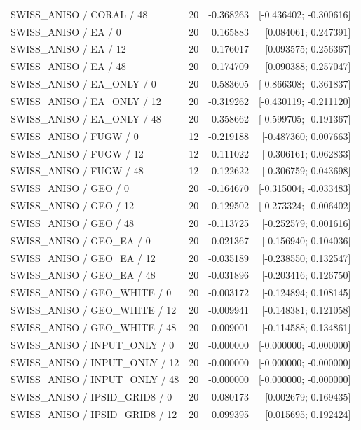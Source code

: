 \begin{longtable}{p{.56\linewidth}rrr}
SWISS\_ANISO / CORAL / 48 & 20 & -0.368263 & [-0.436402; -0.300616] \\
SWISS\_ANISO / EA / 0 & 20 & 0.165883 & [0.084061; 0.247391] \\
SWISS\_ANISO / EA / 12 & 20 & 0.176017 & [0.093575; 0.256367] \\
SWISS\_ANISO / EA / 48 & 20 & 0.174709 & [0.090388; 0.257047] \\
SWISS\_ANISO / EA\_ONLY / 0 & 20 & -0.583605 & [-0.866308; -0.361837] \\
SWISS\_ANISO / EA\_ONLY / 12 & 20 & -0.319262 & [-0.430119; -0.211120] \\
SWISS\_ANISO / EA\_ONLY / 48 & 20 & -0.358662 & [-0.599705; -0.191367] \\
SWISS\_ANISO / FUGW / 0 & 12 & -0.219188 & [-0.487360; 0.007663] \\
SWISS\_ANISO / FUGW / 12 & 12 & -0.111022 & [-0.306161; 0.062833] \\
SWISS\_ANISO / FUGW / 48 & 12 & -0.122622 & [-0.306759; 0.043698] \\
SWISS\_ANISO / GEO / 0 & 20 & -0.164670 & [-0.315004; -0.033483] \\
SWISS\_ANISO / GEO / 12 & 20 & -0.129502 & [-0.273324; -0.006402] \\
SWISS\_ANISO / GEO / 48 & 20 & -0.113725 & [-0.252579; 0.001616] \\
SWISS\_ANISO / GEO\_EA / 0 & 20 & -0.021367 & [-0.156940; 0.104036] \\
SWISS\_ANISO / GEO\_EA / 12 & 20 & -0.035189 & [-0.238550; 0.132547] \\
SWISS\_ANISO / GEO\_EA / 48 & 20 & -0.031896 & [-0.203416; 0.126750] \\
SWISS\_ANISO / GEO\_WHITE / 0 & 20 & -0.003172 & [-0.124894; 0.108145] \\
SWISS\_ANISO / GEO\_WHITE / 12 & 20 & -0.009941 & [-0.148381; 0.121058] \\
SWISS\_ANISO / GEO\_WHITE / 48 & 20 & 0.009001 & [-0.114588; 0.134861] \\
SWISS\_ANISO / INPUT\_ONLY / 0 & 20 & -0.000000 & [-0.000000; -0.000000] \\
SWISS\_ANISO / INPUT\_ONLY / 12 & 20 & -0.000000 & [-0.000000; -0.000000] \\
SWISS\_ANISO / INPUT\_ONLY / 48 & 20 & -0.000000 & [-0.000000; -0.000000] \\
SWISS\_ANISO / IPSID\_GRID8 / 0 & 20 & 0.080173 & [0.002679; 0.169435] \\
SWISS\_ANISO / IPSID\_GRID8 / 12 & 20 & 0.099395 & [0.015695; 0.192424] \\

\end{longtable}

